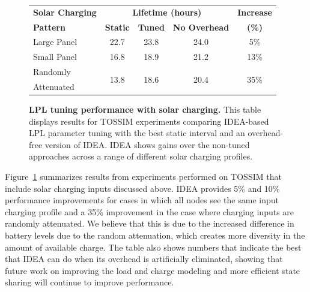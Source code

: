 \begin{figure}[t]
\begin{small}
\begin{center}
\begin{tabular}{|l|cccc|}
\hline
\textbf{Solar Charging} & \multicolumn{3}{c}{\textbf{Lifetime (hours)}} &
\textbf{Increase} \\
\textbf{Pattern} & \textbf{Static} & \textbf{Tuned} & \textbf{No Overhead} & \textbf{(\%)} \\ \hline
Large Panel & 22.7 & 23.8 & 24.0 & 5\% \\
Small Panel & 16.8 & 18.9 & 21.2 & 13\% \\
Randomly & \multirow{2}{*}{13.8} & \multirow{2}{*}{18.6} & \multirow{2}{*}{20.4} & \multirow{2}{*}{35\%} \\
Attenuated & & & & \\ \hline
\end{tabular}
\end{center}
\end{small}
\caption{\small{\textbf{LPL tuning performance with solar charging.}
This table displays results for TOSSIM experiments comparing IDEA-based LPL
parameter tuning with the best static interval and an overhead-free
version of IDEA. IDEA shows gains over the non-tuned approaches
across a range of different solar charging profiles.}}
\label{table-lplvoptimaltossim}
\end{figure}

Figure~\ref{table-lplvoptimaltossim} summarizes results from experiments
performed on TOSSIM that include solar charging inputs discussed above.  IDEA
provides 5\% and 10\% performance improvements for cases in which all nodes
see the same input charging profile and a 35\% improvement in the case where
charging inputs are randomly attenuated. We believe that this is due to the
increased difference in battery levels due to the random attenuation, which
creates more diversity in the amount of available charge. The table also
shows numbers that indicate the best that IDEA can do when its overhead is
artificially eliminated, showing that future work on improving the load and
charge modeling and more efficient state sharing will continue to improve
performance.

